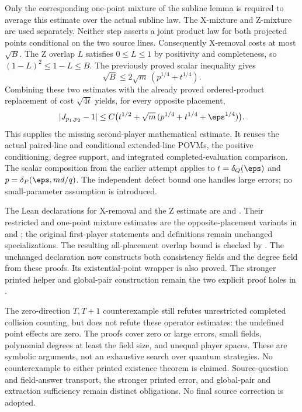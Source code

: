 \documentclass[11pt]{article}
\begin{document}
Only the corresponding one-point mixture of the subline lemma is required
to average this estimate over the actual subline law. The X-mixture and
Z-mixture are used separately. Neither step asserts a joint product law
for both projected points conditional on the two source lines.
Consequently X-removal costs at most $\sqrt B$. The Z overlap $L$ satisfies
$0\leq L\leq1$ by positivity and completeness, so
$(1-L)^2\leq1-L\leq B$. The previously proved scalar inequality gives
\[
 \sqrt B\leq2\sqrt m\,(p^{1/4}+t^{1/4}).
\]
Combining these two estimates with the already proved ordered-product
replacement of cost $\sqrt{4t}$ yields, for every opposite placement,
\[
 |J_{p_1,p_2}-1|
 \leq C\bigl(t^{1/2}+\sqrt m\,(p^{1/4}+t^{1/4}+\eps^{1/4})\bigr).
\]
This supplies the missing second-player mathematical estimate. It reuses
the actual paired-line and conditional extended-line POVMs, the positive
conditioning, degree support, and integrated completed-evaluation comparison.
The scalar composition from the earlier attempt applies to
$t=\delta_Q(\eps)$ and $p=\delta_P(\eps,md/q)$. The independent defect
bound one handles large errors; no small-parameter assumption is introduced.

The Lean declarations for X-removal and the Z estimate are
 and
.
Their restricted and one-point mixture estimates are the opposite-placement
variants in  and
; the original first-player statements
and definitions remain unchanged specializations.
The resulting all-placement overlap bound is checked by
.
The unchanged declaration
now constructs both consistency fields and the degree field from these
proofs. Its existential-point wrapper is also proved. The stronger printed
helper and global-pair construction remain the two explicit proof holes
in .

The zero-direction $T,T+1$ counterexample still refutes unrestricted
completed collision counting, but does not refute these operator estimates:
the undefined point effects are zero. The proofs cover zero or large errors,
small fields, polynomial degrees at least the field size, and unequal player
spaces. These are symbolic arguments, not an exhaustive search over quantum
strategies. No counterexample to either printed existence theorem is claimed.
Source-question and field-answer transport, the stronger printed error, and
global-pair and extraction sufficiency remain distinct obligations. No final
source correction is adopted.
\end{document}
